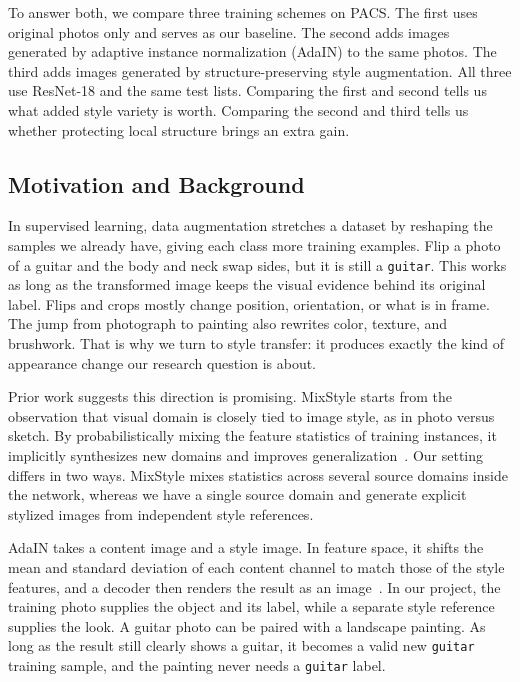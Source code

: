 \documentclass[conference]{IEEEtran}
\begin{document}
To answer both, we compare three training schemes on PACS. The first uses original photos only and serves as our baseline. The second adds images generated by adaptive instance normalization (AdaIN) to the same photos. The third adds images generated by structure-preserving style augmentation. All three use ResNet-18 and the same test lists. Comparing the first and second tells us what added style variety is worth. Comparing the second and third tells us whether protecting local structure brings an extra gain.

\subsection{Motivation and Background}

In supervised learning, data augmentation stretches a dataset by reshaping the samples we already have, giving each class more training examples. Flip a photo of a guitar and the body and neck swap sides, but it is still a \texttt{guitar}. This works as long as the transformed image keeps the visual evidence behind its original label. Flips and crops mostly change position, orientation, or what is in frame. The jump from photograph to painting also rewrites color, texture, and brushwork. That is why we turn to style transfer: it produces exactly the kind of appearance change our research question is about.

Prior work suggests this direction is promising. MixStyle starts from the observation that visual domain is closely tied to image style, as in photo versus sketch. By probabilistically mixing the feature statistics of training instances, it implicitly synthesizes new domains and improves generalization~\cite{zhou2021mixstyle}. Our setting differs in two ways. MixStyle mixes statistics across several source domains inside the network, whereas we have a single source domain and generate explicit stylized images from independent style references.

AdaIN takes a content image and a style image. In feature space, it shifts the mean and standard deviation of each content channel to match those of the style features, and a decoder then renders the result as an image~\cite{huang2017adain}. In our project, the training photo supplies the object and its label, while a separate style reference supplies the look. A guitar photo can be paired with a landscape painting. As long as the result still clearly shows a guitar, it becomes a valid new \texttt{guitar} training sample, and the painting never needs a \texttt{guitar} label.
\end{document}
